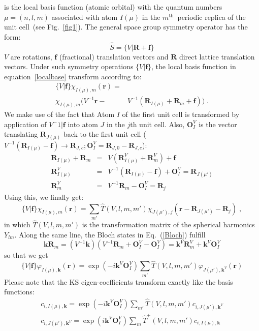 is the local basis function (atomic orbital) with the quantum numbers~$\mu=(n,l,m)$ associated with atom $I(\mu)$ in the $m^\text{th}$~periodic replica of the unit cell~(see Fig.~\ref{fig1}). The general space group symmetry operator has the form:
\begin{equation}
 \hat{S}=\{V|\mathbf{R}+\mathbf{f}\}
\end{equation}
$V$ are rotations, $\mathbf{f}$ (fractional) translation vectors and $\mathbf{R}$ direct lattice translation vectors. Under such symmetry operations
$\{V|\mathbf{f}\}$, the local basis function in equation~\ref{localbase} transform according to:
\begin{align}
\{V|\mathbf{f}\}\chi_{I(\mu),m}(\mathbf{r})=&\\\chi_{I(\mu),m}(V^{-1}\mathbf{r}-
&V^{-1}(\mathbf{R}_{I(\mu)}+\mathbf{R}_m+\mathbf{f})) \;.
\end{align}
We make use of the fact that Atom $I$ of the first unit cell is transformed by application of ${V^-1|\mathbf{f}}$ into atom $J$ in the $j$th unit cell. Also, $\mathbf{O}_I^V$ is the vector translating $\mathbf{R}_{J(\mu)}$ back to the first unit cell ($V^{-1}(\mathbf{R}_{I(\mu)}-\mathbf{f})\rightarrow \mathbf{R}_{J,c}; \mathbf{O}_I^V = \mathbf{R}_{J,0} - \mathbf{R}_{J,c}$): 
\begin{eqnarray}
 \mathbf{R}_{I(\mu)}+\mathbf{R}_m & = & V(\mathbf{R}_{I(\mu)}^V+\mathbf{R}_m^V)+\mathbf{f} \\
 \mathbf{R}_{I(\mu)}^V            & = & V^{-1}(\mathbf{R}_{I(\mu)}-\mathbf{f})+\mathbf{O}_I^V=\mathbf{R}_{J(\mu')}\label{RItoJ} \\
 \mathbf{R}_m^V                   & = & V^{-1}\mathbf{R}_m-\mathbf{O}_I^V=\mathbf{R}_j
\end{eqnarray}
Using this, we finally get:
\begin{equation}
\{V|\mathbf{f}\}\chi_{I(\mu),m}(\mathbf{r})=\sum_{m'}\hat{T}(V,l,m,m')\chi_{J(\mu'),j}(\mathbf{r}-\mathbf{R}_{J(\mu')}-\mathbf{R}_j) \;,
\end{equation}
in which $\hat{T}(V,l,m,m')$ is the transformation matrix of the spherical harmonics $Y_{lm}$. 
Along the same line, the Bloch states in Eq.~(\ref{Bloch}) fulfill
\begin{equation}
 \mathbf{k}\mathbf{R}_m = (V^{-1}\mathbf{k})(V^{-1}\mathbf{R}_m+\mathbf{O}_I^V-\mathbf{O}_I^V)=\mathbf{k}^V\mathbf{R}_m^V+\mathbf{k}^V \mathbf{O}_I^V
\end{equation}
so that we get
\begin{equation}
 \{V|\mathbf{f}\}\varphi_{I(\mu),\mathbf{k}}(\mathbf{r})= \exp\left(-i\mathbf{k}^{V}\mathbf{O}_I^V\right)\sum_{m'}\hat{T}(V,l,m,m')\varphi_{J(\mu'),\mathbf{k}^V}(\mathbf{r})
\end{equation}
Please note that the
KS eigen-coefficients transform exactly like the basis functions:
\begin{align}
c_{i,I(\mu),\mathbf{k}}    = \exp(-i\mathbf{k}^{V}\mathbf{O}_I^V)\sum_{m'}\hat{T}(V,l,m,m')c_{i,J(\mu'),\mathbf{k}^V}\\
c_{i,J(\mu'),\mathbf{k}^V} = \exp(i\mathbf{k}^{V}\mathbf{O}_I^V)\sum_{m}\hat{T}^{+}(V,l,m,m')c_{i,I(\mu),\mathbf{k}}\label{cij_trafo}
\end{align}

